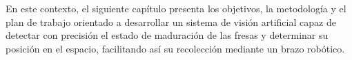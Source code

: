 En este contexto, el siguiente capítulo presenta los objetivos, la metodología y el plan de trabajo orientado a desarrollar un sistema de visión artificial capaz de detectar con precisión el estado de maduración de las fresas y determinar su posición en el espacio, facilitando así su recolección mediante un brazo robótico.









